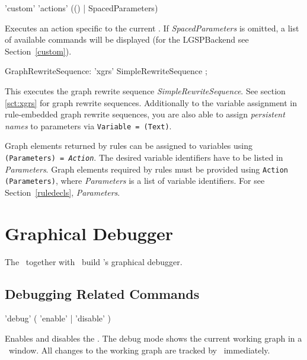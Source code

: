 \begin{rail}
  'custom' 'actions' (() | SpacedParameters)
\end{rail}
Executes an action specific to the current . 
If \emph{SpacedParameters} is omitted, a list of available commands will be displayed (for the LGSPBackend see Section~\ref{custom}).

\makeatletter
\begin{rail}
  GraphRewriteSequence: 'xgrs' SimpleRewriteSequence ;
\end{rail}
This executes the graph rewrite sequence \emph{SimpleRewriteSequence}.
See section \ref{sct:xgrs} for graph rewrite sequences.
Additionally to the variable assignment in rule-embedded graph rewrite sequences, you are also able to assign \emph{persistent names} to parameters via  \texttt{Variable = \@(Text)}.

Graph elements returned by rules can be assigned to variables using \texttt{(Para\-meters) = \emph{Action}}. 
The desired variable identifiers have to be listed in \emph{Parameters}. 
Graph elements required by rules must be provided using \texttt{Action (Para\-meters)}, where \emph{Parameters} is a list of variable identifiers. 
For  see Section~\ref{ruledecls}, \emph{Parameters}.



\section{Graphical Debugger}
\label{sct:debugger}
The \GrShell\ together with \yComp\ build \GrG's graphical debugger.

\subsection{Debugging Related Commands}

\begin{rail}
  'debug' ( 'enable' | 'disable' )
\end{rail}
Enables and disables the .
The debug mode shows the current working graph in a \yComp\ window.
All changes to the working graph are tracked by \yComp\ immediately.  

